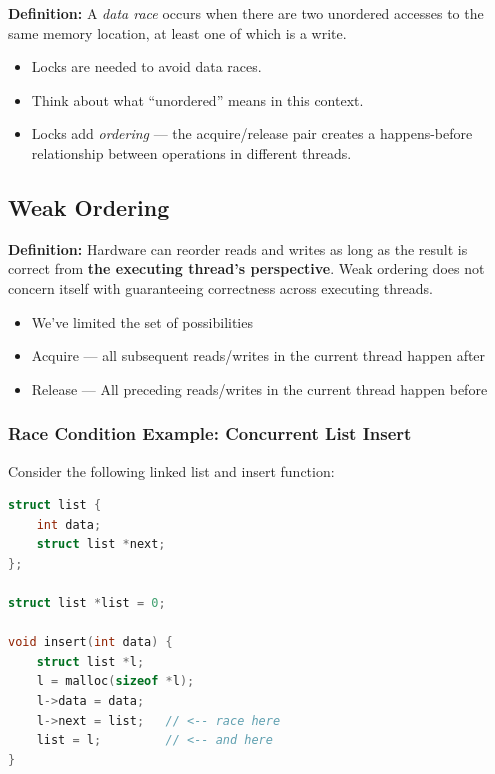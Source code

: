 \documentclass[11pt]{article}
\begin{document}
\textbf{Definition:} A \emph{data race} occurs when there are two unordered accesses to the same memory location, at least one of which is a write.

\begin{itemize}
    \item Locks are needed to avoid data races.
    \item Think about what ``unordered'' means in this context.
    \item Locks add \emph{ordering} --- the acquire/release pair creates a happens-before relationship between operations in different threads.
\end{itemize}

\subsection{Weak Ordering}

\textbf{Definition:} Hardware can reorder reads and writes as long as the result is correct from \textbf{the executing thread's perspective}. Weak ordering does not concern itself with guaranteeing correctness across executing threads.

\begin{itemize}
    \item We've limited the set of possibilities
    \item Acquire --- all subsequent reads/writes in the current thread happen after
    \item Release --- All preceding reads/writes in the current thread happen before
\end{itemize}


\subsubsection*{Race Condition Example: Concurrent List Insert}

Consider the following linked list and insert function:

\begin{lstlisting}[language=C, caption={Concurrent list insert (without locks)}]
struct list {
    int data;
    struct list *next;
};

struct list *list = 0;

void insert(int data) {
    struct list *l;
    l = malloc(sizeof *l);
    l->data = data;
    l->next = list;   // <-- race here
    list = l;         // <-- and here
}
\end{lstlisting}
\end{document}
